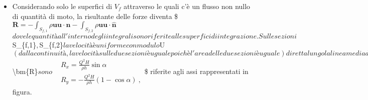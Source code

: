 \documentclass[letterpaper,10pt,italian]{jupyterBook}
\begin{document}
\begin{itemize}
\begin{align*}
\begin{aligned}
\begin{aligned}
      & = \underbrace{- \int_{S_{f\ell}\cup S_{f,1+2}} p_a \bm{\hat{n}_f} - \int_{S_{fs}} p_a \bm{\hat{n}_f}}_{-\oint_{S_f} p_a \bm{\hat{n}_f}=0}
      + \int_{S_{fs}} p_a \bm{\hat{n}_f} + \int_{S_{fs}} \bm{t_n} = & \text{($\bm{\hat{n}_f} = -\bm{\hat{n}_s}$, ${\bm{t_n}}_{fs} = - {\bm{t_n}}_{sf}$ su $S_{fs}$)} \\
      & = - \int_{S_{sf}} p_a \bm{\hat{n}}_{s} - \int_{S_{sf}} {\bm{t_n}}_{sf} = &
       \text{($\oint_{S_s=S_{sf}\cup S_{s\ell}} p_a \bm{\hat{n}_s} = 0)$} \\
      & = + \int_{S_{s\ell}} p_a \bm{\hat{n}}_{s} - \int_{S_{sf}} {\bm{t_n}}_{sf} = &
       \text{(${\bm{t_n}}_s = -p_a\bm{\hat{n}_s}$ su $S_{s\ell}$} \\
      & = - \int_{S_{s\ell}} {\bm{t_n}}_{s} - \int_{S_{sf}} {\bm{t_n}}_{sf} = - \oint_{S_{s}} {\bm{t_n}}_{s} = \\
      & = - \bm{R} \ ,
    \end{aligned}$$ dove $\bm{R}$ è la risultante degli sforzi di
    superficie agente sul solido. In questo esercizio è il contributo
    delle forze di volume (ad esempio il peso) agenti sul solido.\\
-   Sostituendo nell'equazione del bilancio della quantità di moto si
    ottiene:
    $$\bm{R} = - \oint_{S_f} \rho \bm{u} \bm{u} \cdot \hat{\bm{n}}\\
\end{aligned}\end{align*}
\item {} 
\sphinxAtStartPar
Considerando solo le superfici di \(V_f\) attraverso le quali c’è un
flusso non nullo di quantità di moto, la risultante delle forze
diventa
\$\(\bm{R} = - \int_{S_{f,1}} \rho \bm{u} \bm{u} \cdot \hat{\bm{n}} 
          - \int_{S_{f,2}} \rho \bm{u} \bm{u} \cdot \hat{\bm{n}}\)\(
dove le quantità all'interno degli integrali sono riferite alle
superfici di integrazione. Sulle sezioni \)S\_\{f,1\}\(, \)S\_\{f,2\}\( la
velocità è uniforme con modulo \)U\( (dalla continuità, la velocità
sulle due sezioni è uguale poichè l'area delle due sezioni è uguale)
diretta lungo la linea media del getto. Le componenti cartesiane
della risultante \)\textbackslash{}bm\{R\}\( sono \)\(\begin{split}
  & R_x = \frac{Q^2 H}{\rho h} \sin \alpha \\
  & R_y = - \frac{Q^2 H}{\rho h} (1-\cos \alpha) \ ,
\end{split}\)\$ riferite agli assi rappresentati in figura.

\end{itemize}
\end{document}
